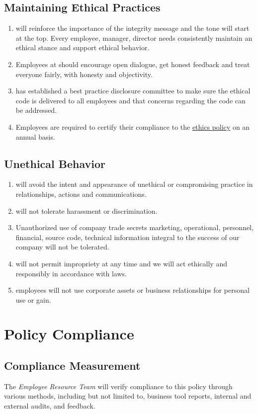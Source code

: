 \subsection{Maintaining Ethical Practices}
\begin{enumerate}
\item
\CompanyName{} will reinforce the importance of the integrity message and the tone will start at the top.  
Every employee, manager,  director needs consistently maintain an ethical stance and support ethical behavior.
\item
Employees at \CompanyName{} should encourage open dialogue, get honest feedback\oxford{} and treat everyone fairly, with honesty and objectivity.
\item
\CompanyName{} has established a best practice disclosure committee to make sure the ethical code is delivered to all employees and that concerns regarding the code can be addressed.
\item
Employees are required to certify their compliance to the \hyperref[E:EtP]{ethics policy} on an annual basis. 
\end{enumerate}
\subsection{Unethical Behavior}
\begin{enumerate}
\item
\CompanyName{} will avoid the intent and appearance of unethical or compromising practice in relationships, actions\oxford{} and communications.  
\item
\CompanyName{} will not tolerate harassment or discrimination.
\item
Unauthorized use of company trade secrets  marketing, operational, personnel, financial, source code,  technical information integral to the success of our company will not be tolerated.
\item
\CompanyName{} will not permit impropriety at any time and we will act ethically and responsibly in accordance with laws.
\item
\CompanyName{} employees will not use corporate assets or business relationships for personal use or gain.
\end{enumerate}
\section{Policy Compliance}
\subsection{Compliance Measurement}
The \textsl{Employee Resource Team} will verify compliance to this policy through various methods, including but not limited to, business tool reports, internal and external audits, and feedback. 
